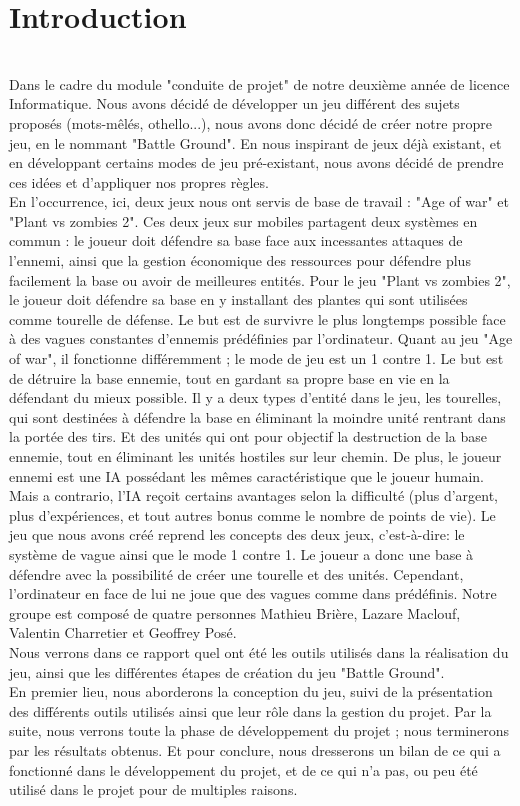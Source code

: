 \documentclass[a4paper,11pt]{article}
\begin{document}
\section {Introduction}
\\Dans le cadre du module "conduite de projet" de notre deuxième année de licence Informatique. Nous avons décidé de développer un jeu différent des sujets proposés (mots-mêlés, othello...), nous avons donc décidé de créer notre propre jeu, en le nommant "Battle Ground". En nous inspirant de jeux déjà existant, et en développant certains modes de jeu pré-existant, nous avons décidé de prendre ces idées et d'appliquer nos propres règles.
\\ En l'occurrence, ici, deux jeux nous ont servis de base de travail : "Age of war" et "Plant vs zombies 2". Ces deux jeux sur mobiles partagent deux systèmes en commun : le joueur doit défendre sa base face aux incessantes attaques de l'ennemi, ainsi que la gestion économique des ressources pour défendre plus facilement la base ou avoir de meilleures entités.
Pour le jeu "Plant vs zombies 2", le joueur doit défendre sa base en y installant des plantes qui sont utilisées comme tourelle de défense. Le but est de survivre le plus longtemps possible face à des vagues constantes d'ennemis prédéfinies par l'ordinateur.
Quant au jeu "Age of war", il fonctionne différemment ; le mode de jeu est un 1 contre 1. Le but est de détruire la base ennemie, tout en gardant sa propre base en vie en la défendant du mieux possible. Il y a deux types d'entité dans le jeu, les tourelles, qui sont destinées à défendre la base en éliminant la moindre unité rentrant dans la portée des tirs. Et des unités qui ont pour objectif la destruction de la base ennemie, tout en éliminant les unités hostiles sur leur chemin. De plus, le joueur ennemi est une IA possédant les mêmes caractéristique que le joueur humain. Mais a contrario, l'IA reçoit certains avantages selon la difficulté (plus d'argent, plus d'expériences, et tout autres bonus comme le nombre de points de vie).
Le jeu que nous avons créé reprend les concepts des deux jeux, c'est-à-dire: le système de vague ainsi que le mode 1 contre 1.
Le joueur a donc une base à défendre avec la possibilité de créer une tourelle et des unités. Cependant, l'ordinateur en face de lui ne joue que des vagues comme dans prédéfinis.
Notre groupe est composé de quatre personnes Mathieu Brière, Lazare Maclouf, Valentin Charretier et Geoffrey Posé.\\
Nous verrons dans ce rapport quel ont été les outils utilisés dans la réalisation du jeu, ainsi que les différentes étapes de création du jeu "Battle Ground".\\
En premier lieu, nous aborderons la conception du jeu, suivi de la présentation des différents outils utilisés ainsi que leur rôle dans la gestion du projet. Par la suite, nous verrons toute la phase de développement du projet ; nous terminerons par les résultats obtenus. Et pour conclure, nous dresserons un bilan de ce qui a fonctionné dans le développement du projet, et de ce qui n'a pas, ou peu été utilisé dans le projet pour de multiples raisons.\\
\end{document}
